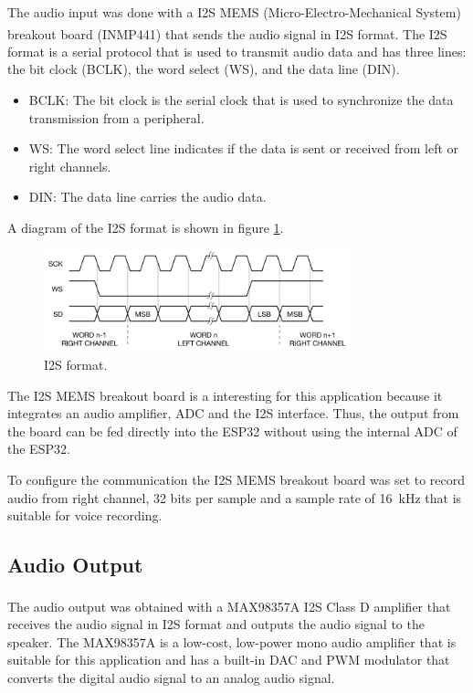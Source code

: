 The audio input was done with a I2S MEMS (Micro-Electro-Mechanical System) breakout board (INMP441)\textsuperscript{\cite{INMP441-datasheet}} that sends the audio signal in I2S format. The I2S format is a serial protocol that is used to transmit audio data and has three lines: the bit clock (BCLK), the word select (WS), and the data line (DIN). 
\begin{itemize}
    \item BCLK: The bit clock is the serial clock that is used to synchronize the data transmission from a peripheral.
    \item WS: The word select line indicates if the data is sent or received from left or right channels.
    \item DIN: The data line carries the audio data.
\end{itemize}

A diagram of the I2S format is shown in figure \ref{fig:I2S}.

\begin{figure}[H]
    \centering
    \includegraphics[width=0.8\textwidth]{Images/i2s.png}
    \caption{I2S format.}
    \label{fig:I2S}
\end{figure}

The I2S MEMS breakout board is a interesting for this application because it integrates an audio amplifier, ADC and the I2S interface. Thus, the output from the board can be fed directly into the ESP32 without using the internal ADC of the ESP32.

To configure the communication the I2S MEMS breakout board was set to record audio from right channel, 32 bits per sample and a sample rate of \SI{16}{\kilo \hertz} that is suitable for voice recording. 

\subsection{Audio Output}

The audio output was obtained with a MAX98357A \textsuperscript{\cite{MAX98357A-datasheet}} I2S Class D amplifier that receives the audio signal in I2S format and outputs the audio signal to the speaker. The MAX98357A is a low-cost, low-power mono audio amplifier that is suitable for this application and has a built-in DAC and PWM modulator that converts the digital audio signal to an analog audio signal. 

